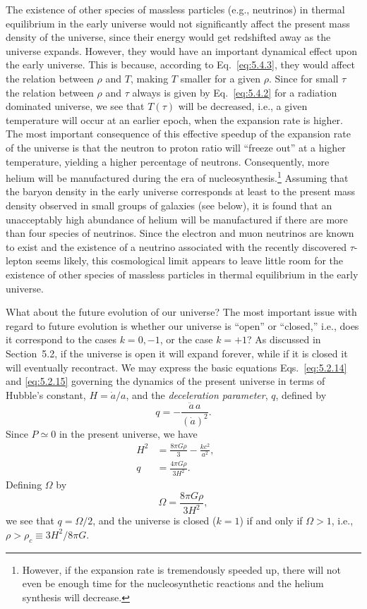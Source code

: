The existence of other species of massless particles (e.g., neutrinos) in thermal
equilibrium in the early universe would not significantly affect the present mass density
of the universe, since their energy would get redshifted away as the universe expands.
However, they would have an important dynamical effect upon the early universe. This
is because, according to Eq.~\eqref{eq:5.4.3}, they would affect the relation between
\(\rho\) and \(T\), making \(T\) smaller for a given \(\rho\). Since for small \(\tau\)
the relation between \(\rho\) and \(\tau\) always is given by Eq.~\eqref{eq:5.4.2} for a
radiation dominated universe, we see that \(T(\tau)\) will be decreased, i.e., a given
temperature will occur at an earlier epoch, when the expansion rate is higher. The most
important consequence of this effective speedup of the expansion rate of the universe
is that the neutron to proton ratio will ``freeze out'' at a higher temperature, yielding a
higher percentage of neutrons. Consequently, more helium will be manufactured during
the era of nucleosynthesis.\footnote{However, if the expansion rate is tremendously
speeded up, there will not even be enough time for the nucleosynthetic reactions and
the helium synthesis will decrease.} Assuming that the baryon density in the early
universe corresponds at least to the present mass density observed in small groups of
galaxies (see below), it is found that an unacceptably high abundance of helium will
be manufactured if there are more than four species of neutrinos. Since the electron
and muon neutrinos are known to exist and the existence of a neutrino associated with
the recently discovered \(\tau\)-lepton seems likely, this cosmological limit appears
to leave little room for the existence of other species of massless particles in thermal
equilibrium in the early universe.

What about the future evolution of our universe? The most important issue with
regard to future evolution is whether our universe is ``open'' or ``closed,'' i.e., does
it correspond to the cases \(k=0,-1\), or the case \(k=+1\)? As discussed in
Section~5.2, if the universe is open it will expand forever, while if it is closed it
will eventually recontract. We may express the basic equations
Eqs.~\eqref{eq:5.2.14} and \eqref{eq:5.2.15} governing the dynamics of the present
universe in terms of Hubble's constant, \(H=\dot a/a\), and the \emph{deceleration
parameter}, \(q\), defined by
\begin{equation}
  q=-\frac{\ddot a\,a}{(\dot a)^2}.
  \tag{5.4.6}\label{eq:5.4.6}
\end{equation}
Since \(P\simeq0\) in the present universe, we have
\begin{align}
  H^2&=\frac{8\pi G\rho}{3}-\frac{kc^2}{a^2}, &&\tag{5.4.7}\label{eq:5.4.7}\\
  q&=\frac{4\pi G\rho}{3H^2}. &&\tag{5.4.8}\label{eq:5.4.8}
\end{align}
Defining \(\Omega\) by
\begin{equation}
  \Omega=\frac{8\pi G\rho}{3H^2},
  \tag{5.4.9}\label{eq:5.4.9}
\end{equation}
we see that \(q=\Omega/2\), and the universe is closed (\(k=1\)) if and only if
\(\Omega>1\), i.e., \(\rho>\rho_c\equiv3H^2/8\pi G\).

